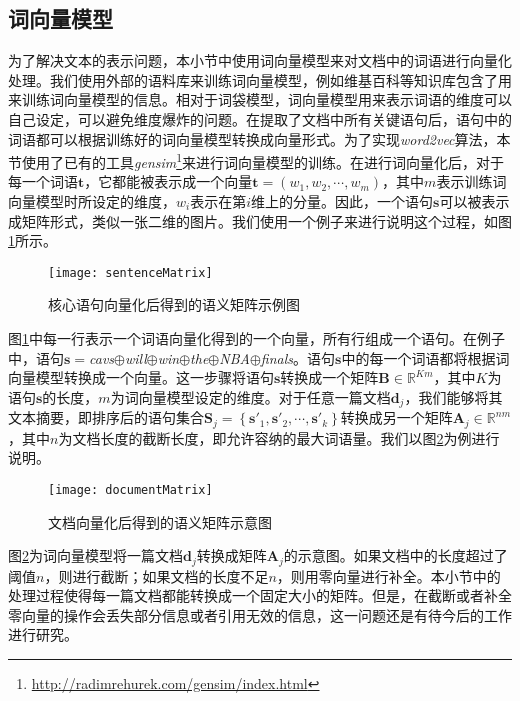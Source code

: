 \subsection{词向量模型}
\label{subsec3:word2vec}
为了解决文本的表示问题，本小节中使用词向量模型来对文档中的词语进行向量化处理。我们使用外部的语料库来训练词向量模型，例如维基百科等知识库包含了用来训练词向量模型的信息。相对于词袋模型，词向量模型用来表示词语的维度可以自己设定，可以避免维度爆炸的问题。在提取了文档中所有关键语句后，语句中的词语都可以根据训练好的词向量模型转换成向量形式。为了实现\textit{word2vec}算法，本节使用了已有的工具\textit{gensim}\footnote{\url{http://radimrehurek.com/gensim/index.html}}来进行词向量模型的训练。在进行词向量化后，对于每一个词语$\mathbf{t}$，它都能被表示成一个向量$\mathbf{t}=\left(w_1, w_2, \cdots, w_m\right)$，其中$m$表示训练词向量模型时所设定的维度，$w_i$表示在第$i$维上的分量。因此，一个语句$\mathbf{s}$可以被表示成矩阵形式，类似一张二维的图片。我们使用一个例子来进行说明这个过程，如图\ref{fig:senVec}所示。

\begin{figure}[!htbp]
  \centering
  \texttt{[image: sentenceMatrix]}
  \caption{核心语句向量化后得到的语义矩阵示例图}
  \label{fig:senVec}
\end{figure}

图\ref{fig:senVec}中每一行表示一个词语向量化得到的一个向量，所有行组成一个语句。在例子中，语句$\mathbf{s}=$\textit{cavs}$\oplus$\textit{will}$\oplus$\textit{win}$\oplus$\textit{the}$\oplus$\textit{NBA}$\oplus$\textit{finals}。语句$\mathbf{s}$中的每一个词语都将根据词向量模型转换成一个向量。这一步骤将语句$\mathbf{s}$转换成一个矩阵$\mathbf{B} \in \mathbb{R}^{Km}$，其中$K$为语句$\mathbf{s}$的长度，$m$为词向量模型设定的维度。对于任意一篇文档$\mathbf{d}_j$，我们能够将其文本摘要，即排序后的语句集合$\mathbf{S}_j = \left\{\mathbf{s}'_1, \mathbf{s}'_2, \cdots, \mathbf{s}'_k\right\}$转换成另一个矩阵$\mathbf{A}_j \in \mathbb{R}^{nm}$，其中$n$为文档长度的截断长度，即允许容纳的最大词语量。我们以图\ref{fig:docVec}为例进行说明。

\begin{figure}[!htbp]
  \centering
  \texttt{[image: documentMatrix]}
  \caption{文档向量化后得到的语义矩阵示意图}
  \label{fig:docVec}
\end{figure}

图\ref{fig:docVec}为词向量模型将一篇文档$\mathbf{d}_j$转换成矩阵$\mathbf{A}_j$的示意图。如果文档中的长度超过了阈值$n$，则进行截断；如果文档的长度不足$n$，则用零向量进行补全。本小节中的处理过程使得每一篇文档都能转换成一个固定大小的矩阵。但是，在截断或者补全零向量的操作会丢失部分信息或者引用无效的信息，这一问题还是有待今后的工作进行研究。

